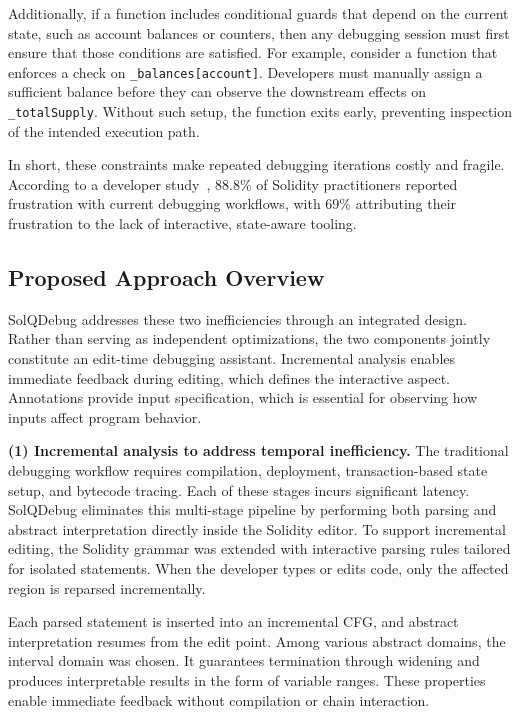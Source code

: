 \documentclass[pdflatex,sn-basic]{sn-jnl}%
\theoremstyle{thmstyleone}%
\theoremstyle{thmstyletwo}%
\theoremstyle{thmstylethree}%
\begin{document}
        Additionally, if a function includes conditional guards that depend on the current state, such as account balances or counters,
        then any debugging session must first ensure that those conditions are satisfied.
        For example, consider a function that enforces a check on \texttt{\_balances[account]}.
        Developers must manually assign a sufficient balance before they can observe the downstream effects on \texttt{\_totalSupply}.
        Without such setup, the function exits early, preventing inspection of the intended execution path.

        In short, these constraints make repeated debugging iterations costly and fragile.
        According to a developer study~\citep{interview}, 88.8\% of Solidity practitioners reported frustration with current debugging workflows,
        with 69\% attributing their frustration to the lack of interactive, state-aware tooling.

    \subsection{Proposed Approach Overview}

        SolQDebug addresses these two inefficiencies through an integrated design.
        Rather than serving as independent optimizations, the two components jointly constitute an edit-time debugging assistant.
        Incremental analysis enables immediate feedback during editing, which defines the interactive aspect.
        Annotations provide input specification, which is essential for observing how inputs affect program behavior.

        \smallskip
        \noindent\textbf{(1) Incremental analysis to address temporal inefficiency.}
        The traditional debugging workflow requires compilation, deployment, transaction-based state setup, and bytecode tracing.
        Each of these stages incurs significant latency.
        SolQDebug eliminates this multi-stage pipeline by performing both parsing and abstract interpretation directly inside the Solidity editor.
        To support incremental editing, the Solidity grammar was extended with interactive parsing rules tailored for isolated statements.
        When the developer types or edits code, only the affected region is reparsed incrementally.

        Each parsed statement is inserted into an incremental CFG, and abstract interpretation resumes from the edit point.
        Among various abstract domains, the interval domain was chosen.
        It guarantees termination through widening and produces interpretable results in the form of variable ranges.
        These properties enable immediate feedback without compilation or chain interaction.
\end{document}
